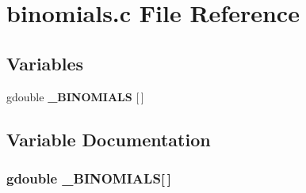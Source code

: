 \section{binomials.\+c File Reference}
\label{binomials_8c}
\subsection*{Variables}
\begin{DoxyCompactItemize}
\item 
gdouble {\bf \+\_\+\+B\+I\+N\+O\+M\+I\+A\+L\+S} [$\,$]
\end{DoxyCompactItemize}


\subsection{Variable Documentation}
\subsubsection[{\+\_\+\+B\+I\+N\+O\+M\+I\+A\+L\+S}]{\setlength{\rightskip}{0pt plus 5cm}gdouble \+\_\+\+B\+I\+N\+O\+M\+I\+A\+L\+S[$\,$]}\label{binomials_8c_a0feda282d4fb2fdda2304ac3ba3f96ab}
